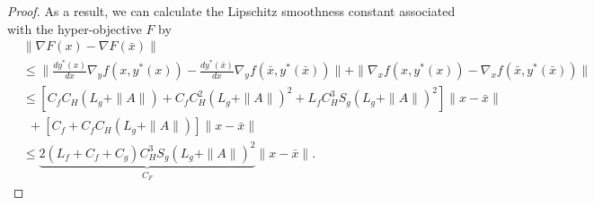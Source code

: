 \begin{proof}
As a result, we can calculate the Lipschitz smoothness constant associated with the hyper-objective $F$ by
\begin{align*}
&\|\nabla F(x) - \nabla F(\bar x)\| \\
&\leq \|\frac{dy^*(x)}{dx}\nabla_y f(x,y^*(x))-\frac{dy^*(\bar x)}{dx}\nabla_y f(\bar x,y^*(\bar x))\|+ \|\nabla_x f(x,y^*(x)) - \nabla_x f(\bar x, y^*(\bar x))\|\\
&\leq  [C_fC_H (L_g + \|A\|) + C_f C^2_H (L_g + \|A\|)^2+ L_f C_H^3 S_g (L_g+\|A\|)^2]\|x-\bar x\| \\
&\ \ +[C_f + C_f C_H (L_g +\|A\|)] \|x-\bar x\|\\
&\leq \underbrace{ 2(L_f +C_f+C_g)C_H^3 S_g (L_g +\|A\|)^2}_{C_F}\|x-\bar x\|.
\end{align*}

\end{proof}


